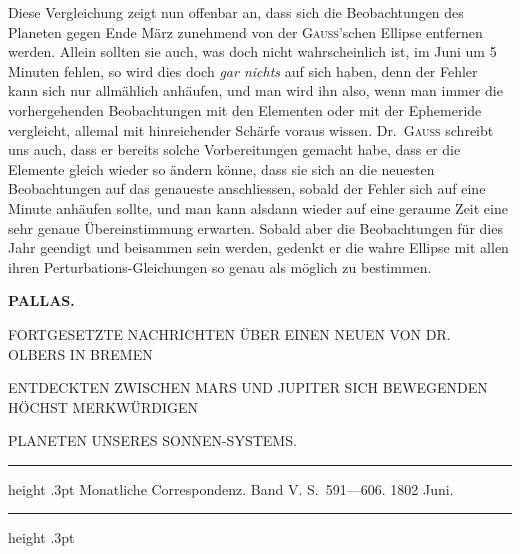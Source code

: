 Diese Vergleichung zeigt nun offenbar an, dass sich die Beobachtungen des Planeten gegen Ende März zunehmend von der \textsc{Gauss}'schen Ellipse entfernen werden. Allein sollten sie auch, was doch nicht wahrscheinlich ist, im Juni um 5 Minuten fehlen, so wird dies doch \textit{gar nichts} auf sich haben, denn der Fehler kann sich nur allmählich anhäufen, und man wird ihn also, wenn man immer die vorhergehenden Beobachtungen mit den Elementen oder mit der Ephemeride vergleicht, allemal mit hinreichender Schärfe voraus wissen. Dr.\ \textsc{Gauss} schreibt uns auch, dass er bereits solche Vorbereitungen gemacht habe, dass er die Elemente gleich wieder so ändern könne, dass sie sich an die neuesten Beobachtungen auf das genaueste anschliessen, sobald der Fehler sich auf eine Minute anhäufen sollte, und man kann alsdann wieder auf eine geraume Zeit eine sehr genaue Übereinstimmung erwarten. Sobald aber die Beobachtungen für dies Jahr geendigt und beisammen sein werden, gedenkt er die wahre Ellipse mit allen ihren Perturbations-Gleichungen so genau als möglich zu bestimmen.
\begin{flushright}\end{flushright}
\clearpage
\thispagestyle{empty}
\noindent{}%
%
\parbox[t]{\dimexpr\linewidth-24mm\relax}{\centering\footnotesize\bfseries PALLAS.\par}%
\makebox[12mm][r]{}\par\nobreak\medskip
{}
\begin{center}
{\fontsize{7.4}{10}\selectfont
FORTGESETZTE NACHRICHTEN ÜBER EINEN NEUEN VON DR. OLBERS IN BREMEN\par
ENTDECKTEN ZWISCHEN MARS UND JUPITER SICH BEWEGENDEN HÖCHST MERKWÜRDIGEN\par
PLANETEN UNSERES SONNEN-SYSTEMS.\par}
\end{center}
\begin{center}
\parbox{.75\linewidth}{%
  \centering\fontsize{8.2}{10.2}\selectfont
  \hrule height .3pt\relax\vspace{2.5pt}
  Monatliche Correspondenz. Band V. S.\ 591—606. 1802 Juni.\par
  \vspace{2.5pt}\hrule height .3pt\relax
}
\end{center}
